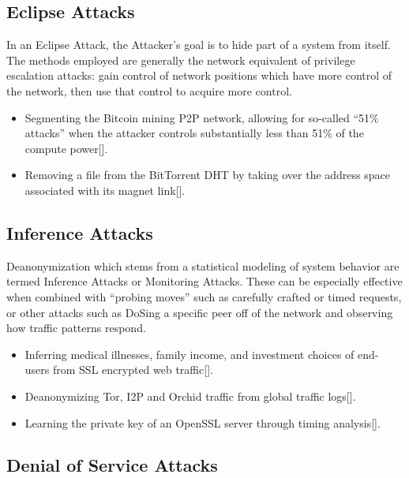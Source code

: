 \documentclass{article}
\newcommand{\mesh}{Orchid}
\begin{document}
\subsection{Eclipse Attacks}

In an Eclipse Attack, the Attacker's goal is to hide part of a system from itself. The methods employed are generally the network equivalent of privilege escalation attacks: gain control of network positions which have more control of the network, then use that control to acquire more control.

\begin{itemize}
    \item Segmenting the Bitcoin mining P2P network, allowing for so-called “51\% attacks” when the attacker controls substantially less than 51\% of the compute power[\cite{bitcoinEclipse}].
    \item Removing a file from the BitTorrent DHT by taking over the address space associated with its magnet link[\cite{bittorrentSybilAttacks}].
\end{itemize}

\subsection{Inference Attacks}
\label{inference-attacks}

Deanonymization which stems from a statistical modeling of system behavior are termed Inference Attacks or Monitoring Attacks. These can be especially effective when combined with “probing moves” such as carefully crafted or timed requests, or other attacks such as DoSing a specific peer off of the network and observing how traffic patterns respond.

\begin{itemize}
    \item Inferring medical illnesses, family income, and investment choices of end- users from SSL encrypted web traffic[\cite{broadInferenceAttacks}].
    \item Deanonymizing Tor, I2P and \mesh{} traffic from global traffic logs[\cite{mixTrafficAnalysis}].
    \item Learning the private key of an OpenSSL server through timing analysis[\cite{opensslTimingAttack}].
\end{itemize}

\subsection{Denial of Service Attacks}
\end{document}
